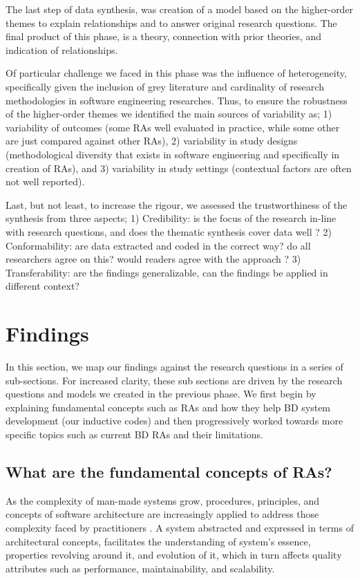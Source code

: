 \documentclass{ieeeaccess}
\begin{document}
The last step of data synthesis, was creation of a model based on the higher-order themes to explain relationships and to answer original research questions. The final product of this phase, is a theory, connection with prior theories, and indication of relationships. 

Of particular challenge we faced in this phase was the influence of heterogeneity, specifically given the inclusion of grey literature and cardinality of research methodologies in software engineering researches. Thus, to ensure the robustness of the higher-order themes we identified the main sources of variability as; 1) variability of outcomes (some RAs well evaluated in practice, while some other are just compared against other RAs), 2) variability in study designs (methodological diversity that exists in software engineering and specifically in creation of RAs), and 3) variability in study settings (contextual factors are often not well reported).

Last, but not least, to increase the rigour, we assessed the trustworthiness of the synthesis from three aspects; 1) Credibility: is the focus of the research in-line with research questions, and does the thematic synthesis cover data well ? 2) Conformability: are data extracted and coded in the correct way? do all researchers agree on this? would readers agree with the approach ? 3) Transferability: are the findings generalizable, can the findings be applied in different context? 

\section{Findings}

In this section, we map our findings against the research questions in a series of sub-sections. For increased clarity, these sub sections are driven by the research questions and models we created in the previous phase. We first begin by explaining fundamental concepts such as RAs and how they help BD system development (our inductive codes) and then progressively worked towards more specific topics such as current BD RAs and their limitations.

\subsection{What are the fundamental concepts of RAs?}

As the complexity of man-made systems grow, procedures, principles, and concepts of software architecture are increasingly applied to address those complexity faced by practitioners \cite{AtaeiACIS}. A system abstracted and expressed in terms of architectural concepts, facilitates the understanding of system’s essence, properties revolving around it, and evolution of it, which in turn affects quality attributes such as performance, maintainability, and scalability. 
\end{document}
